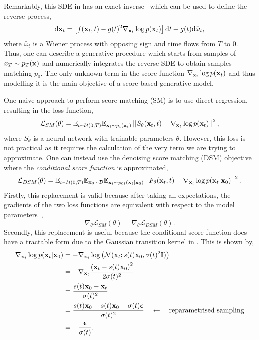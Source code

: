 Remarkably, this SDE in  has an exact inverse~\cite{ReversetimeDiffusionEquation} which can be used to define the reverse-process,
\begin{equation}
    \label{eq:reverse_sde}
    \mathrm{d} \mathbf{x}_t = \left[ f(\mathbf{x}_t, t) - g(t)^2 \nabla_{\mathbf{x}_t} \log p(\mathbf{x}_t) \right] \mathrm{d} t + g(t) \mathrm{d} \bar\omega_t,
\end{equation}
where $\bar\omega_t$ is a Wiener process with opposing sign and time flows from $T$ to $0$.
Thus, one can describe a generative procedure which starts from samples of $x_T \sim p_T(\mathbf{x})$ and numerically integrates the reverse SDE to obtain samples matching $p_0$.
The only unknown term in  the score function $\nabla_{\mathbf{x}_t} \log p(\mathbf{x}_t)$ and thus modelling it is the main objective of a score-based generative model.

One naive approach to perform score matching (SM) is to use direct regression, resulting in the loss function,
\begin{equation}
    \label{eq:naive_loss}
    \mathcal{L}_{SM}(\theta) =
    \mathbb{E}_{t \sim \mathcal{U}(0, T)}
    \mathbb{E}_{\mathbf{x}_t \sim p_t(\mathbf{x}_t)}
    \left|\left|S_\theta(\mathbf{x}_t, t) - \nabla_{\mathbf{x}_t} \log p(\mathbf{x}_t)\right|\right|^2,
\end{equation}
where $S_\theta$ is a neural network with trainable parameters $\theta$.
However, this loss is not practical as it requires the calculation of the very term we are trying to approximate.
One can instead use the denoising score matching (DSM) objective~\cite{ScoreMatching, SlicedScoreMatching} where the \textit{conditional score function} is approximated,
\begin{equation}
    \label{eq:denoising_loss}
    \mathcal{L}_{DSM}(\theta) =
    \mathbb{E}_{t \sim \mathcal{U}(0, T)}
    \mathbb{E}_{\mathbf{x}_0 \sim \mathcal{D}}
    \mathbb{E}_{\mathbf{x}_t \sim p_{0t}(\mathbf{x}_t|\mathbf{x}_0)}
    \left|\left|F_\theta(\mathbf{x}_t, t) - \nabla_{\mathbf{x}_t} \log p(\mathbf{x}_t|\mathbf{x}_0)\right|\right|^2.
\end{equation}
Firstly, this replacement is valid because after taking all expectations, the gradients of the two loss functions are equivalent with respect to the model parameters~\cite{ScoreBasedGenerativeModeling},
\begin{equation}
    \nabla_{\theta} \mathcal{L}_{SM}(\theta) = \nabla_{\theta} \mathcal{L}_{DSM}(\theta).
\end{equation}
Secondly, this replacement is useful because the conditional score function does have a tractable form due to the Gaussian transition kernel in .
This is shown by,
\begin{equation}
    \begin{aligned}
        \label{eq:conditional_score}
        \nabla_{\mathbf{x}_t} \log p(\mathbf{x}_t|\mathbf{x}_0)
        &= -\nabla_{\mathbf{x}_t} \log \left( \mathcal{N}(\mathbf{x}_t; s(t)\mathbf{x}_0, \sigma(t)^2 \mathbb{I}) \right) \\
        &= -\nabla_{\mathbf{x}_t} \frac{\left(\mathbf{x}_t - s(t)\mathbf{x}_0\right)^2}{2\sigma(t)^2} \\
        &= \frac{s(t)\mathbf{x}_0 - \mathbf{x}_t}{\sigma(t)^2} \\
        &= \frac{s(t)\mathbf{x}_0 - s(t)\mathbf{x}_0 - \sigma(t)\boldsymbol{\epsilon}}{\sigma(t)^2} \quad \leftarrow \quad \text{reparametrised sampling} \\
        &= - \frac{\boldsymbol{\epsilon}}{\sigma(t)}.
    \end{aligned}
\end{equation}
